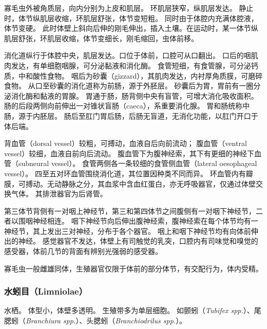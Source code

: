 \documentclass[11pt]{article}
\begin{document}
\newline

寡毛虫外被角质层，向内分别为上皮和肌层。
环肌层狭窄，纵肌层发达。
静止时，体节纵肌层收缩，环肌层舒张，体节变短粗。
同时由于体腔内充满体腔液，体节变硬。
此时体壁上斜向后伸的刚毛伸出，插入土壤。在运动时，某一体节纵肌层舒张，环肌层收缩，体节变细长，刚毛缩回，虫体前移。

\newline

消化道纵行于体腔中央，肌层发达。口位于体前，口腔可从口翻出。
口后的咽肌肉发达，有单细胞咽腺，可分泌黏液和消化酶。
食管短细，有食管腺，可分泌钙质，中和酸性食物。
咽后为砂囊（gizzard），其肌肉发达，内衬厚角质膜，可磨碎食物。
从口至砂囊的消化道称为前肠，源于外胚层。
砂囊后为胃，胃前有一圈分泌消化酶和黏液的胃腺。
胃通于肠，肠背侧中央有盲管，可增大消化吸收面积。
肠的后段两侧向前伸出一对锥状盲肠（caeca），系重要消化腺。
胃和肠统称中肠，源于内胚层。
肠后至肛门胃后肠，后肠无盲道，无消化功能，以肛门开口于体后端。

\newline

背血管（dorsal vessel）较粗，可搏动，血液自后向前流动；
腹血管（ventral vessel）较细，血液自前向后流动。
腹血管下为腹神经索，其下有更细的神经下血管（subneural vessel）。
食管两侧各一条较细的食管侧血管（lateral oesophageal vessel）。
四至五对环血管围绕消化道，其位置因种类不同而异。
环血管内有瓣膜，可搏动。无动静脉之分，其血浆中含血红蛋白，亦无呼吸器官，仅通过体壁交换气体。
其排泄器官为后肾管。

\newline

第三体节背侧有一对咽上神经节，第三和第四体节之间腹侧有一对咽下神经节，二者以围咽神经相连。
咽下神经节向后伸出腹神经索，腹神经索在每个体节均有一神经节，其上发出三对神经，分布于各个器官。
咽上和咽下神经节均有向体前伸出的神经。
感觉器官不发达，体壁上有司触觉的乳突，口腔内有司味觉和嗅觉的感受器，体前几节的背面有辨别光强弱的感受器。

\newline

寡毛虫一般雌雄同体，生殖器官仅限于体前的部分体节，有交配行为，体内受精。

\subsubsection{水蚓目（Limniolae）}
水栖。
体型小，体壁多透明。
生殖带多为单层细胞。
如颤蚓（\textit{Tubifex spp.}）、尾腮蚓（\textit{Branchiura spp.}）、头腮蚓（\textit{Branchiodrilus spp.}）。
\end{document}

